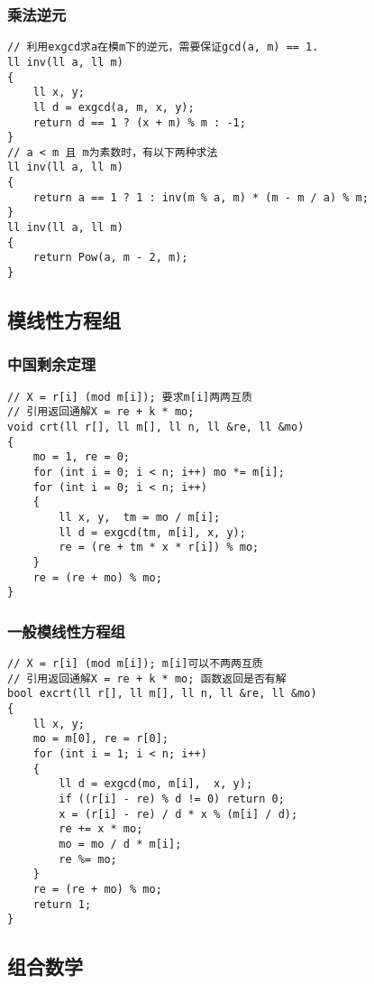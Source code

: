 \documentclass[a4]{article}
\begin{document}
\subsubsection{乘法逆元}
\begin{lstlisting}
// 利用exgcd求a在模m下的逆元，需要保证gcd(a, m) == 1.
ll inv(ll a, ll m)
{
    ll x, y;
    ll d = exgcd(a, m, x, y);
    return d == 1 ? (x + m) % m : -1;
}
// a < m 且 m为素数时，有以下两种求法
ll inv(ll a, ll m)
{
    return a == 1 ? 1 : inv(m % a, m) * (m - m / a) % m;
}
ll inv(ll a, ll m)
{
    return Pow(a, m - 2, m);
}
\end{lstlisting}
\subsection{模线性方程组}
\subsubsection{中国剩余定理}
\begin{lstlisting}
// X = r[i] (mod m[i]); 要求m[i]两两互质
// 引用返回通解X = re + k * mo;
void crt(ll r[], ll m[], ll n, ll &re, ll &mo)
{
    mo = 1, re = 0;
    for (int i = 0; i < n; i++) mo *= m[i];
    for (int i = 0; i < n; i++)
    {
        ll x, y,  tm = mo / m[i];
        ll d = exgcd(tm, m[i], x, y);
        re = (re + tm * x * r[i]) % mo;
    }
    re = (re + mo) % mo;
}
\end{lstlisting}
\subsubsection{一般模线性方程组}
\begin{lstlisting}
// X = r[i] (mod m[i]); m[i]可以不两两互质
// 引用返回通解X = re + k * mo; 函数返回是否有解
bool excrt(ll r[], ll m[], ll n, ll &re, ll &mo)
{
    ll x, y;
    mo = m[0], re = r[0];
    for (int i = 1; i < n; i++)
    {
        ll d = exgcd(mo, m[i],  x, y);
        if ((r[i] - re) % d != 0) return 0;
        x = (r[i] - re) / d * x % (m[i] / d);
        re += x * mo;
        mo = mo / d * m[i];
        re %= mo;
    }
    re = (re + mo) % mo;
    return 1;
}
\end{lstlisting}
\subsection{组合数学}
\end{document}
